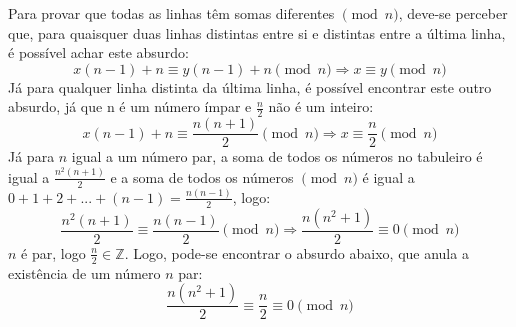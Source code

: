 \documentclass{article}
\begin{document}
  Para provar que todas as linhas têm somas diferentes $\pmod{n}$, deve-se perceber que,
  para quaisquer duas linhas distintas entre si e distintas entre a última linha, é
  possível achar este absurdo:
  \[
    x(n-1) + n \equiv y(n-1) + n \pmod{n} \Rightarrow x \equiv y \pmod{n}
  \]
  Já para qualquer linha distinta da última linha, é possível encontrar este outro 
  absurdo, já que n é um número ímpar e $\frac{n}{2}$ não é um inteiro:
  \[
    x(n-1) + n \equiv \frac{n(n+1)}{2} \pmod{n} \Rightarrow x \equiv \frac{n}{2} \pmod{n}
  \]
  Já para $n$ igual a um número par, a soma de todos os números no tabuleiro é igual
  a $\frac{n^2(n+1)}{2}$ e a soma de todos os números $\pmod{n}$ é igual a 
  $0 + 1 + 2 + ... + (n - 1) = \frac{n(n-1)}{2}$, logo:
  \[
    \frac{n^2(n+1)}{2} \equiv \frac{n(n-1)}{2} \pmod{n} \Rightarrow \frac{n(n^2+1)}{2} \equiv 0 \pmod{n}
  \]
  $n$ é par, logo $\frac{n}{2} \in \mathbb{Z}$. Logo, pode-se encontrar o absurdo
  abaixo, que anula a existência de um número $n$ par:
  \[
    \frac{n(n^2 + 1)}{2} \equiv \frac{n}{2} \equiv 0 \pmod{n}
  \]
\end{document}
